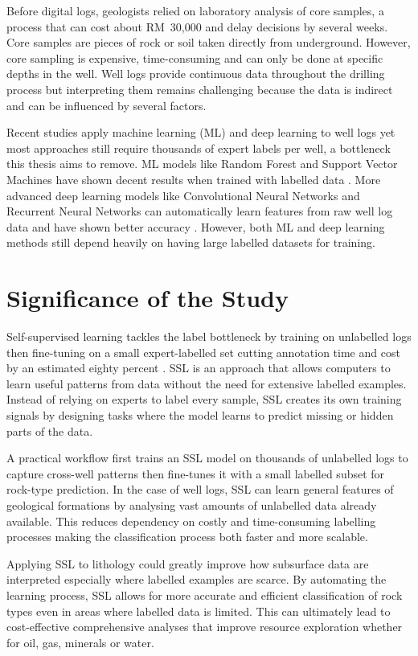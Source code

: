 Before digital logs, geologists relied on laboratory analysis of core samples, a process that can cost about RM~30,000 and delay decisions by several weeks. Core samples are pieces of rock or soil taken directly from underground. However, core sampling is expensive, time-consuming and can only be done at specific depths in the well. Well logs provide continuous data throughout the drilling process but interpreting them remains challenging because the data is indirect and can be influenced by several factors.

Recent studies apply machine learning (ML) and deep learning to well logs yet most approaches still require thousands of expert labels per well, a bottleneck this thesis aims to remove. ML models like Random Forest and Support Vector Machines have shown decent results when trained with labelled data \parencite{Dubois2007}. More advanced deep learning models like Convolutional Neural Networks and Recurrent Neural Networks can automatically learn features from raw well log data and have shown better accuracy \parencite{Zeng2020}. However, both ML and deep learning methods still depend heavily on having large labelled datasets for training.


\section{Significance of the Study}

Self-supervised learning tackles the label bottleneck by training on unlabelled logs then fine-tuning on a small expert-labelled set cutting annotation time and cost by an estimated eighty percent \parencite{Romanenkova2022}. SSL is an approach that allows computers to learn useful patterns from data without the need for extensive labelled examples. Instead of relying on experts to label every sample, SSL creates its own training signals by designing tasks where the model learns to predict missing or hidden parts of the data.

A practical workflow first trains an SSL model on thousands of unlabelled logs to capture cross-well patterns then fine-tunes it with a small labelled subset for rock-type prediction. In the case of well logs, SSL can learn general features of geological formations by analysing vast amounts of unlabelled data already available. This reduces dependency on costly and time-consuming labelling processes making the classification process both faster and more scalable.

Applying SSL to lithology could greatly improve how subsurface data are interpreted especially where labelled examples are scarce. By automating the learning process, SSL allows for more accurate and efficient classification of rock types even in areas where labelled data is limited. This can ultimately lead to cost-effective comprehensive analyses that improve resource exploration whether for oil, gas, minerals or water.


